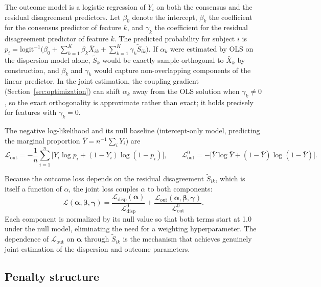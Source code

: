 \documentclass[referee,lineno,pdflatex,sn-vancouver-num]{sn-jnl}
\begin{document}
The outcome model is a logistic regression of $Y_i$ on both the consensus and the residual disagreement predictors.
Let $\beta_0$ denote the intercept, $\beta_k$ the coefficient for the consensus predictor of feature $k$, and $\gamma_k$ the coefficient for the residual disagreement predictor of feature $k$.
The predicted probability for subject $i$ is
$p_i = \mathrm{logit}^{-1}\!\bigl(\beta_0 + \sum_{k=1}^K \beta_k \bar X_{ik} + \sum_{k=1}^K \gamma_k \tilde S_{ik}\bigr)$.
If $\alpha_k$ were estimated by OLS on the dispersion model alone, $\tilde S_k$ would be exactly sample-orthogonal to $\bar X_k$ by construction, and $\beta_k$ and $\gamma_k$ would capture non-overlapping components of the linear predictor.
In the joint estimation, the coupling gradient (Section~\ref{sec:optimization}) can shift $\alpha_k$ away from the OLS solution when $\gamma_k \neq 0$, so the exact orthogonality is approximate rather than exact; it holds precisely for features with $\gamma_k = 0$.

The negative log-likelihood and its null baseline (intercept-only model, predicting the marginal proportion $\bar Y = n^{-1}\sum_i Y_i$) are
\[
  \mathcal{L}_{\mathrm{out}} = -\frac{1}{n}\sum_{i=1}^n \bigl[Y_i \log p_i + (1-Y_i)\log(1-p_i)\bigr],
  \qquad
  \mathcal{L}_{\mathrm{out}}^0 = -\bigl[\bar Y \log \bar Y + (1-\bar Y)\log(1-\bar Y)\bigr].
\]

Because the outcome loss depends on the residual disagreement $\tilde S_{ik}$, which is itself a function of $\alpha$, the joint loss couples $\alpha$ to both components:
\begin{equation}\label{eq:joint_loss}
  \mathcal{L}(\boldsymbol{\alpha}, \boldsymbol{\beta}, \boldsymbol{\gamma}) = \frac{\mathcal{L}_{\mathrm{disp}}(\boldsymbol{\alpha})}{\mathcal{L}_{\mathrm{disp}}^0}
              + \frac{\mathcal{L}_{\mathrm{out}}(\boldsymbol{\alpha}, \boldsymbol{\beta}, \boldsymbol{\gamma})}{\mathcal{L}_{\mathrm{out}}^0}.
\end{equation}
Each component is normalized by its null value so that both terms start at 1.0 under the null model, eliminating the need for a weighting hyperparameter.
The dependence of $\mathcal{L}_{\mathrm{out}}$ on $\boldsymbol{\alpha}$ through $\tilde S_{ik}$ is the mechanism that achieves genuinely joint estimation of the dispersion and outcome parameters.

\subsection{Penalty structure}\label{sec:penalty}
\end{document}
